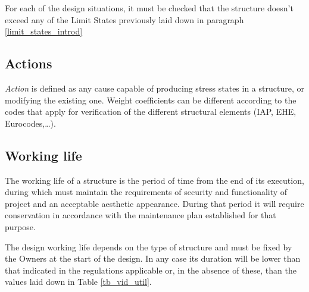For each of the design situations, it must be checked that the structure doesn't exceed any of the Limit States previously laid down in paragraph \ref{limit_states_introd}

\subsection{Actions}
\emph{Action} is defined as any cause capable of producing stress states in a structure, or modifying the existing one. Weight coefficients can be different according to the codes that apply for verification of the different structural elements (IAP, EHE, Eurocodes,\ldots).

\subsection{Working life} \label{sc_vida_util}
The working life of a structure is the period of time from the end of its execution, during which must maintain the requirements of security and functionality of project and an acceptable aesthetic appearance. During that period it will require conservation in accordance with the maintenance plan established for that purpose.

The design working life depends on the type of structure and must be fixed by the Owners at the start of the design. In any case its duration will be lower than that indicated in the regulations applicable or, in the absence of these, than the values laid down in Table \ref{tb_vid_util}.


